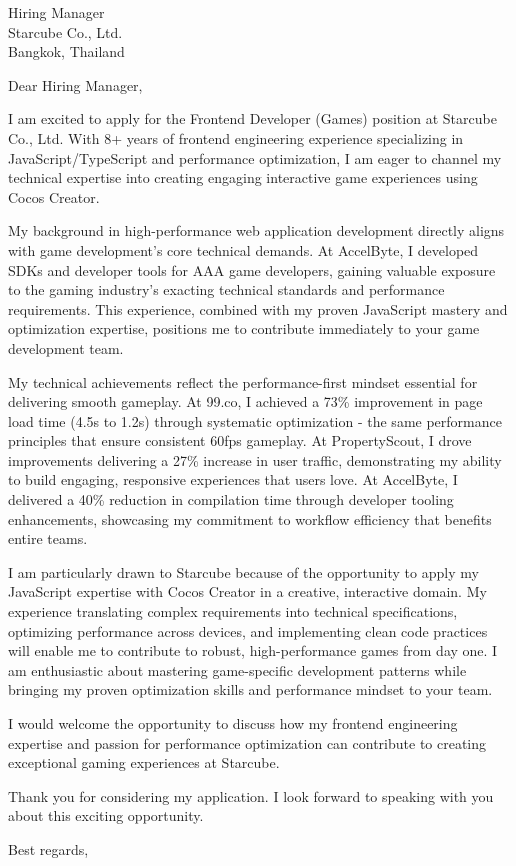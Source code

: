 \documentclass[11pt]{letter}
\begin{document}
\begin{letter}{
  Hiring Manager \\
  Starcube Co., Ltd. \\
  Bangkok, Thailand
}

\opening{Dear Hiring Manager,}
I am excited to apply for the Frontend Developer (Games) position at Starcube Co., Ltd. With 8+ years of frontend engineering experience specializing in JavaScript/TypeScript and performance optimization, I am eager to channel my technical expertise into creating engaging interactive game experiences using Cocos Creator.

My background in high-performance web application development directly aligns with game development's core technical demands. At AccelByte, I developed SDKs and developer tools for AAA game developers, gaining valuable exposure to the gaming industry's exacting technical standards and performance requirements. This experience, combined with my proven JavaScript mastery and optimization expertise, positions me to contribute immediately to your game development team.

My technical achievements reflect the performance-first mindset essential for delivering smooth gameplay. At 99.co, I achieved a 73\% improvement in page load time (4.5s to 1.2s) through systematic optimization - the same performance principles that ensure consistent 60fps gameplay. At PropertyScout, I drove improvements delivering a 27\% increase in user traffic, demonstrating my ability to build engaging, responsive experiences that users love. At AccelByte, I delivered a 40\% reduction in compilation time through developer tooling enhancements, showcasing my commitment to workflow efficiency that benefits entire teams.

I am particularly drawn to Starcube because of the opportunity to apply my JavaScript expertise with Cocos Creator in a creative, interactive domain. My experience translating complex requirements into technical specifications, optimizing performance across devices, and implementing clean code practices will enable me to contribute to robust, high-performance games from day one. I am enthusiastic about mastering game-specific development patterns while bringing my proven optimization skills and performance mindset to your team.

I would welcome the opportunity to discuss how my frontend engineering expertise and passion for performance optimization can contribute to creating exceptional gaming experiences at Starcube.

Thank you for considering my application. I look forward to speaking with you about this exciting opportunity.

\closing{Best regards,}

\end{letter}
\end{document}

